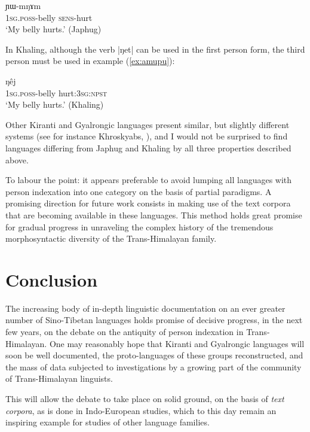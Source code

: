 \documentclass[oldfontcommands,oneside,a4paper,11pt]{article}
\newcommand{\ipa}[1]{{\phon \mbox{#1}}} %
\begin{document}
\begin{exe}
\ex \label{ex:YWmNAm}
\gll \ipa{a-xtu} 	\ipa{ɲɯ-mŋɤm} \\
\textsc{1sg.poss}-belly \textsc{sens}-hurt \\
\glt `My belly hurts.' (Japhug)
\end{exe}

In Khaling, although the verb \ipa{|ŋet|} can be used in the first person form, the third person must be used in example (\ref{ex:amupu}):

\begin{exe}
\ex \label{ex:amupu}
\gll \ipa{ʔʌ-mupu} 	\ipa{ŋêj} \\
\textsc{1sg.poss}-belly hurt:\textsc{3sg:npst} \\
\glt `My belly hurts.' (Khaling)
\end{exe}

Other Kiranti and Gyalrongic languages present similar, but slightly different systems (see for instance Khroskyabs, \citealt{lai15person}), and I would not be surprised to find languages differing from Japhug and Khaling by all three properties described above. 

To labour the point: it appears preferable to avoid lumping all languages with person indexation into one category on the basis of partial paradigms. A promising direction for future work consists in making use of the text corpora that are becoming available in these languages. This method holds great promise for gradual progress in unraveling the complex history of  the tremendous morphosyntactic diversity of the Trans-Himalayan family.

\section{Conclusion}

The increasing body of in-depth linguistic documentation on an ever greater number of Sino-Tibetan languages holds promise of decisive progress, in the next few years, on the debate on the antiquity of person indexation in Trans-Himalayan. One may reasonably hope that Kiranti and Gyalrongic languages will soon be well documented, the proto-languages of these groups reconstructed, and the mass of data subjected to investigations by a growing part of  the community of Trans-Himalayan linguists.

This will allow the debate to take place on solid ground,  on the basis of \textit{text corpora}, as is done in Indo-European studies, which to this day remain an inspiring example for studies of other language families.

\charis


\end{document}
